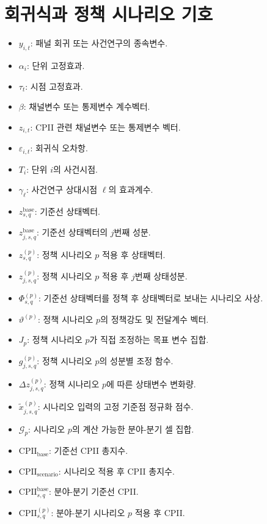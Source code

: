 \documentclass[11pt,a4paper]{report}
\begin{document}
\section{회귀식과 정책 시나리오 기호}
\begingroup
\footnotesize
\begin{itemize}[leftmargin=1.8em,itemsep=0.35em]
\item \(y_{i,t}\): 패널 회귀 또는 사건연구의 종속변수.
\item \(\alpha_i\): 단위 고정효과.
\item \(\tau_t\): 시점 고정효과.
\item \(\beta\): 채널변수 또는 통제변수 계수벡터.
\item \(z_{i,t}\): CPII 관련 채널변수 또는 통제변수 벡터.
\item \(\varepsilon_{i,t}\): 회귀식 오차항.
\item \(T_i\): 단위 \(i\)의 사건시점.
\item \(\gamma_{\ell}\): 사건연구 상대시점 \(\ell\)의 효과계수.
\item \(z^{\mathrm{base}}_{s,q}\): 기준선 상태벡터.
\item \(z^{\mathrm{base}}_{j,s,q}\): 기준선 상태벡터의 \(j\)번째 성분.
\item \(z^{(p)}_{s,q}\): 정책 시나리오 \(p\) 적용 후 상태벡터.
\item \(z^{(p)}_{j,s,q}\): 정책 시나리오 \(p\) 적용 후 \(j\)번째 상태성분.
\item \(\Phi^{(p)}_{s,q}\): 기준선 상태벡터를 정책 후 상태벡터로 보내는 시나리오 사상.
\item \(\vartheta^{(p)}\): 정책 시나리오 \(p\)의 정책강도 및 전달계수 벡터.
\item \(J_p\): 정책 시나리오 \(p\)가 직접 조정하는 목표 변수 집합.
\item \(g^{(p)}_{j,s,q}\): 정책 시나리오 \(p\)의 성분별 조정 함수.
\item \(\Delta z^{(p)}_{j,s,q}\): 정책 시나리오 \(p\)에 따른 상태변수 변화량.
\item \(\tilde{x}^{(p)}_{j,s,q}\): 시나리오 입력의 고정 기준점 정규화 점수.
\item \(\mathcal G_p\): 시나리오 \(p\)의 계산 가능한 분야-분기 셀 집합.
\item \(\mathrm{CPII}_{\mathrm{base}}\): 기준선 CPII 총지수.
\item \(\mathrm{CPII}_{\mathrm{scenario}}\): 시나리오 적용 후 CPII 총지수.
\item \(\mathrm{CPII}^{\mathrm{base}}_{s,q}\): 분야-분기 기준선 CPII.
\item \(\mathrm{CPII}^{(p)}_{s,q}\): 분야-분기 시나리오 \(p\) 적용 후 CPII.

\end{itemize}
\end{document}
